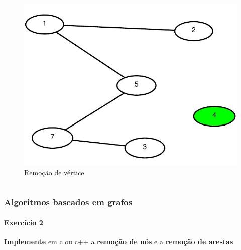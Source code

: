 \begin{frame}
\begin{columns}
\begin{column}{0.6\textwidth}
{\begin{figure}
					\includegraphics[width=0.8\linewidth]{images/remocaoDeVertice01}
					\caption{Remoção de vértice}
					\label{fig:remocaodevertice02}
				\end{figure}
			}
		\end{column}
	\end{columns}
\end{frame}

\begin{frame}
	\frametitle{Algoritmos baseados em grafos}
	\framesubtitle{Exercício 2}
	\par \textbf{Implemente} em c ou c++ a \textbf{remoção de nós} e a \textbf{remoção de arestas}
\end{frame}

